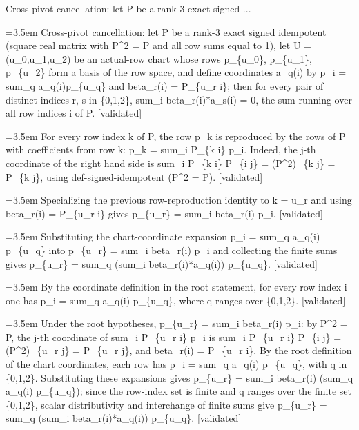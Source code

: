 \documentclass{article}
\newcommand{\step}[1]{\par\noindent\hangindent=3.5em\hangafter=1%
  \makebox[3.5em][l]{\textbf{#1.}}}
\newcommand{\steptag}[1]{\hfill{\small\textsf{[#1]}}}
\begin{document}
\begin{proofbox}{Cross-pivot cancellation: let P be a rank-3 exact signed ...}
\step{1} Cross-pivot cancellation: let P be a rank-3 exact signed idempotent (square real matrix with P\textasciicircum{}2 = P and all row sums equal to 1), let U = (u\_0,u\_1,u\_2) be an actual-row chart whose rows p\_\{u\_0\}, p\_\{u\_1\}, p\_\{u\_2\} form a basis of the row space, and define coordinates a\_q(i) by p\_i = sum\_q a\_q(i)p\_\{u\_q\} and beta\_r(i) = P\_\{u\_r i\}; then for every pair of distinct indices r, s in \{0,1,2\}, sum\_i beta\_r(i)*a\_s(i) = 0, the sum running over all row indices i of P. \steptag{validated} \\[6pt]
\step{1.1} For every row index k of P, the row p\_k is reproduced by the rows of P with coefficients from row k: p\_k = sum\_i P\_\{k i\} p\_i. Indeed, the j-th coordinate of the right hand side is sum\_i P\_\{k i\} P\_\{i j\} = (P\textasciicircum{}2)\_\{k j\} = P\_\{k j\}, using def-signed-idempotent (P\textasciicircum{}2 = P). \steptag{validated} \\[4pt]
\step{1.2} Specializing the previous row-reproduction identity to k = u\_r and using beta\_r(i) = P\_\{u\_r i\} gives p\_\{u\_r\} = sum\_i beta\_r(i) p\_i. \steptag{validated} \\[4pt]
\step{1.3} Substituting the chart-coordinate expansion p\_i = sum\_q a\_q(i) p\_\{u\_q\} into p\_\{u\_r\} = sum\_i beta\_r(i) p\_i and collecting the finite sums gives p\_\{u\_r\} = sum\_q (sum\_i beta\_r(i)*a\_q(i)) p\_\{u\_q\}. \steptag{validated} \\[6pt]
\step{1.3.1} By the coordinate definition in the root statement, for every row index i one has p\_i = sum\_q a\_q(i) p\_\{u\_q\}, where q ranges over \{0,1,2\}. \steptag{validated} \\[4pt]
\step{1.3.2} Under the root hypotheses, p\_\{u\_r\} = sum\_i beta\_r(i) p\_i: by P\textasciicircum{}2 = P, the j-th coordinate of sum\_i P\_\{u\_r i\} p\_i is sum\_i P\_\{u\_r i\} P\_\{i j\} = (P\textasciicircum{}2)\_\{u\_r j\} = P\_\{u\_r j\}, and beta\_r(i) = P\_\{u\_r i\}. By the root definition of the chart coordinates, each row has p\_i = sum\_q a\_q(i) p\_\{u\_q\}, with q in \{0,1,2\}. Substituting these expansions gives p\_\{u\_r\} = sum\_i beta\_r(i) (sum\_q a\_q(i) p\_\{u\_q\}); since the row-index set is finite and q ranges over the finite set \{0,1,2\}, scalar distributivity and interchange of finite sums give p\_\{u\_r\} = sum\_q (sum\_i beta\_r(i)*a\_q(i)) p\_\{u\_q\}. \steptag{validated} \\[6pt]

\end{proofbox}
\end{document}
